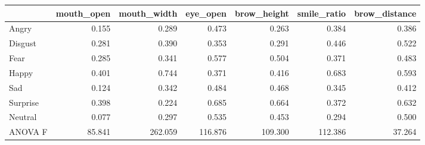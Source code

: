 \begin{tabular}{lrrrrrr}
\toprule
{} &  mouth\_open &  mouth\_width &  eye\_open &  brow\_height &  smile\_ratio &  brow\_distance \\
\midrule
Angry    &       0.155 &        0.289 &     0.473 &        0.263 &        0.384 &          0.386 \\
Disgust  &       0.281 &        0.390 &     0.353 &        0.291 &        0.446 &          0.522 \\
Fear     &       0.285 &        0.341 &     0.577 &        0.504 &        0.371 &          0.483 \\
Happy    &       0.401 &        0.744 &     0.371 &        0.416 &        0.683 &          0.593 \\
Sad      &       0.124 &        0.342 &     0.484 &        0.468 &        0.345 &          0.412 \\
Surprise &       0.398 &        0.224 &     0.685 &        0.664 &        0.372 &          0.632 \\
Neutral  &       0.077 &        0.297 &     0.535 &        0.453 &        0.294 &          0.500 \\
ANOVA F  &      85.841 &      262.059 &   116.876 &      109.300 &      112.386 &         37.264 \\
\bottomrule
\end{tabular}

